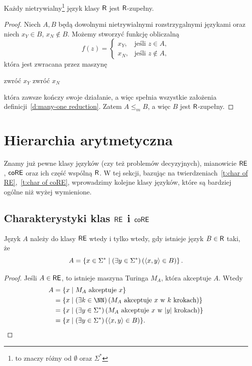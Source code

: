 \begin{theorem}\label{t:nontrivial R language is R-complete}
    Każdy nietrywialny\footnote{to znaczy różny od $\emptyset$ oraz $\Sigma^*$} język klasy $\textsf{R}$ jest $\textsf{R}$-zupełny.
\end{theorem}
\begin{proof}
    Niech $A, B$ będą dowolnymi nietrywialnymi rozstrzygalnymi językami oraz niech $x_Y \in B$, $x_N \notin B$. Możemy stworzyć funkcję obliczalną
    \[ f(z) =
        \begin{cases}
            x_Y, & \text{jeśli } z \in A, \\
            x_N, & \text{jeśli } z \notin A,
        \end{cases}
    \]
    która jest zwracana przez maszynę
    \begin{algorithmic}
            \State zwróć $x_Y$
        \Else
            \State zwróć $x_N$
        \EndIf
    \end{algorithmic}
    która zawsze kończy swoje działanie, a więc spełnia wszystkie założenia definicji~\ref{d:many-one reduction}. Zatem $A \leq_m B$, a więc $B$ jest $\textsf{R}$-zupełny.
\end{proof}

\section{Hierarchia arytmetyczna}
Znamy już pewne klasy języków (czy też problemów decyzyjnych), mianowicie $\textsf{RE}$, $\textsf{coRE}$ oraz ich część wspólną $\textsf{R}$. W tej sekcji, bazując na twierdzeniach~\ref{t:char of RE},~\ref{t:char of coRE}, wprowadzimy kolejne klasy języków, które są bardziej ogólne niż wyżej wymienione.

\subsection{Charakterystyki klas $\textsf{RE}$ i $\textsf{coRE}$}

\begin{theorem}\label{t:char of RE}
    Język $A$ należy do klasy $\textsf{RE}$ wtedy i tylko wtedy, gdy istnieje język $B \in \textsf{R}$ taki, że
    \[ A = \left\{x \in \Sigma^* \mid \left(\exists y \in \Sigma^* \right) \left(\left\langle x, y \right\rangle \in B\right) \right\}. \]
\end{theorem}
\begin{proof}
    Jeśli $A \in \textsf{RE}$, to istnieje maszyna Turinga $M_A$, która akceptuje $A$. Wtedy
    \begin{align*}
        A &= \{x \mid M_A \text{ akceptuje } x\} \\
        &= \{x \mid \left(\exists k \in \NN\right) \left(M_A \text{ akceptuje } x \text{ w } k \text{ krokach}\right)\} \\
        &= \{x \mid \left(\exists y \in \Sigma^*\right) \left(M_A \text{ akceptuje } x \text{ w } |y| \text{ krokach}\right)\} \\
        &= \{x \mid \left(\exists y \in \Sigma^*\right) \left(\encode{x, y} \in B\right)\}.
    \end{align*}
\end{proof}

